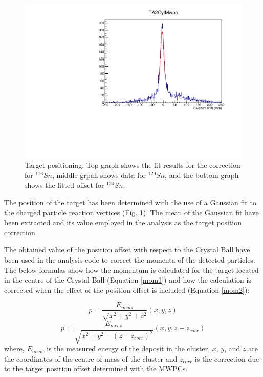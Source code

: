 \begin{figure}[H]
\begin{center}
\includegraphics[scale=0.55]{pictures/pdf/VertexZ_sn124.pdf}
\caption{Target positioning. Top graph shows the fit results for the correction for $^{116}Sn$, middle grpah shows data for $^{120}Sn$, and the bottom graph shows the fitted offset for $^{124}Sn$.}
\label{targetvertex}
\end{center}
\end{figure}

The position of the target has been determined with the use of a Gaussian fit to the charged particle reaction vertices (Fig. \ref{targetvertex}). The mean of the Gaussian fit have been extracted and its value employed in the analysis as the target position correction.

\indent The obtained value of the position offset with respect to the Crystal Ball have been used in the analysis code to correct the momenta of the detected particles. The below formulas show how the momentum is calculated for the target located in the centre of the Crystal Ball (Equation \ref{mom1}) and how the calculation is corrected when the effect of the position offset is included (Equation \ref{mom2}):

\begin{equation}
p = \frac{E_{meas}}{\sqrt{x^{2}+y^{2}+z^{2}}}(x,y,z)
\label{mom1}
\end{equation}
\begin{equation}
p = \frac{E_{meas}}{\sqrt{x^{2}+y^{2}+(z-z_{corr})^{2}}}(x,y,z-z_{corr})
\label{mom2}
\end{equation}
where, $E_{meas}$ is the measured energy of the deposit in the cluster, $x$, $y$, and $z$ are the coordinates of the centre of mass of the cluster and $z_{corr}$ is the correction due to the target position offset determined with the MWPCs.

